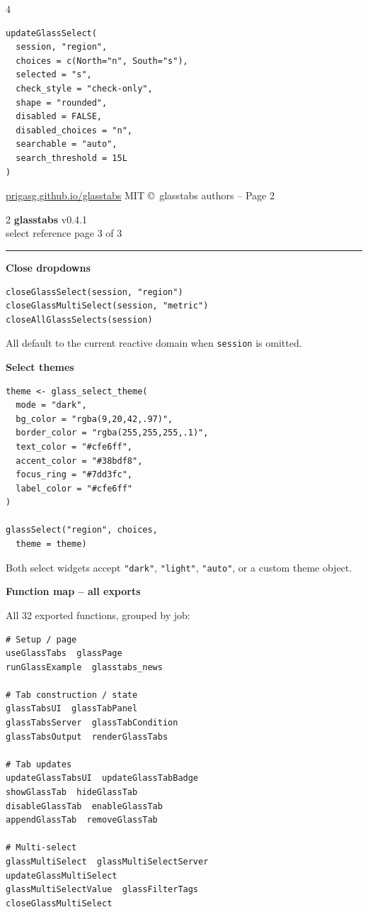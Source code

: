 \documentclass[9pt,a4paper]{article}
\newcommand{\code}[1]{\texttt{\footnotesize\color{codefg}#1}}
\newcommand{\gtval}[1]{\texttt{\footnotesize\color{gtyellow}#1}}
\newcommand{\mysection}[1]{%
  \vspace{3pt}%
  \noindent\colorbox{sectionbg}{%
    \parbox{\dimexpr\linewidth-2\fboxsep\relax}{%
      \strut\textbf{\small\color{white}#1}\strut%
    }%
  }%
  \vspace{2pt}\par%
}
\newcommand{\sheetheader}[2]{%
  {\large\bfseries\color{gtblue}glasstabs}%
  \hfill{\tiny\color{gtgray}v0.4.1}\\[1pt]
  {\footnotesize\color{gtgray}#1}%
  \hfill{\tiny\color{gtgray}#2}\\[-3pt]
  \rule{\linewidth}{0.6pt}
}
\begin{document}
\begin{multicols*}{4}
\begin{lstlisting}
updateGlassSelect(
  session, "region",
  choices = c(North="n", South="s"),
  selected = "s",
  check_style = "check-only",
  shape = "rounded",
  disabled = FALSE,
  disabled_choices = "n",
  searchable = "auto",
  search_threshold = 15L
)
\end{lstlisting}

\vfill
{\tiny\color{gtgray}
\href{https://prigasg.github.io/glasstabs/}{prigasg.github.io/glasstabs}
\hfill MIT \copyright\ glasstabs authors -- Page 2}
\end{multicols*}

\newpage
\begin{multicols*}{2}
\raggedcolumns
\footnotesize
\sheetheader{select reference}{page 3 of 3}

\mysection{Close dropdowns}

\begin{lstlisting}
closeGlassSelect(session, "region")
closeGlassMultiSelect(session, "metric")
closeAllGlassSelects(session)
\end{lstlisting}
All default to the current reactive domain when
\code{session} is omitted.

\mysection{Select themes}

\begin{lstlisting}
theme <- glass_select_theme(
  mode = "dark",
  bg_color = "rgba(9,20,42,.97)",
  border_color = "rgba(255,255,255,.1)",
  text_color = "#cfe6ff",
  accent_color = "#38bdf8",
  focus_ring = "#7dd3fc",
  label_color = "#cfe6ff"
)

glassSelect("region", choices,
  theme = theme)
\end{lstlisting}
Both select widgets accept \gtval{"dark"}, \gtval{"light"},
\gtval{"auto"}, or a custom theme object.

\mysection{Function map -- all exports}

All 32 exported functions, grouped by job:
\begin{lstlisting}
# Setup / page
useGlassTabs  glassPage
runGlassExample  glasstabs_news

# Tab construction / state
glassTabsUI  glassTabPanel
glassTabsServer  glassTabCondition
glassTabsOutput  renderGlassTabs

# Tab updates
updateGlassTabsUI  updateGlassTabBadge
showGlassTab  hideGlassTab
disableGlassTab  enableGlassTab
appendGlassTab  removeGlassTab

# Multi-select
glassMultiSelect  glassMultiSelectServer
updateGlassMultiSelect
glassMultiSelectValue  glassFilterTags
closeGlassMultiSelect


\end{lstlisting}
\end{multicols*}
\end{document}
